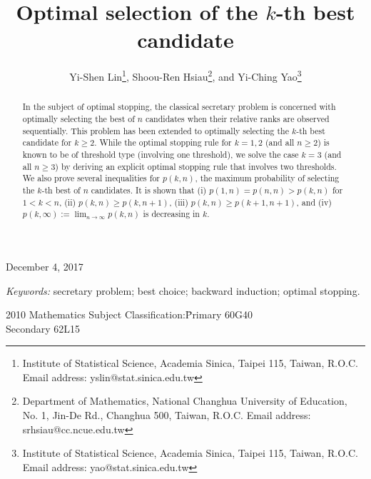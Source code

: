 \documentclass[12pt, A4paper, oneside]{article}
\theoremstyle{plain}
\numberwithin{equation}{section}
\begin{document}
\fontsize{12}{25pt}\selectfont

\title{Optimal selection of  the $k$-th best candidate}

\author{
   Yi-Shen Lin\thanks{Institute of Statistical Science, Academia Sinica, Taipei 115, Taiwan, R.O.C. Email address: yslin@stat.sinica.edu.tw},\;\; Shoou-Ren Hsiau\thanks{Department of Mathematics, National Changhua University of Education, No. 1, Jin-De Rd., Changhua 500, Taiwan, R.O.C. Email address: srhsiau@cc.ncue.edu.tw},\; and Yi-Ching Yao\thanks{Institute of Statistical Science, Academia Sinica, Taipei 115, Taiwan, R.O.C. Email address: yao@stat.sinica.edu.tw}
    \date{}
    } \maketitle
\centerline {December 4, 2017}
\begin{abstract}
\fontsize{12}{18pt}\selectfont
In the subject of optimal stopping, the classical secretary problem is concerned with optimally selecting the best of $n$ candidates
when their relative ranks are observed sequentially. This problem has been extended to optimally selecting the $k$-th best candidate
for  $k\ge 2$. While the optimal stopping rule for $k=1,2$ (and all $n\ge 2$) is known to be of threshold type (involving one threshold),
we solve the case $k=3$ (and  all $n\ge 3$) by deriving an explicit optimal stopping rule that involves two thresholds. We also prove
several inequalities for $p(k,n)$, the maximum probability of selecting the $k$-th best of $n$ candidates. It is shown
that (i) $p(1,n)=p(n,n)>p(k,n)$ for $1<k<n$, (ii) $p(k,n)\ge p(k,n+1)$, (iii) $p(k,n)\ge p(k+1,n+1)$,
and (iv) $p(k,\infty):=\lim_{n\to \infty} p(k,n)$ is decreasing in $k$.
\end{abstract}
\emph{Keywords:} secretary problem; best choice; backward induction; optimal stopping.
\begin{tabbing}
2010 Mathematics Subject Classification:\;\=Primary 60G40\\
\>Secondary 62L15
\end{tabbing}


\fontsize{12}{20pt}\selectfont
\end{document}
